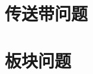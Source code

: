 \documentclass[a4paper, 12pt]{article}
\begin{document}
\section{传送带问题}
\section{板块问题}
\end{document}
